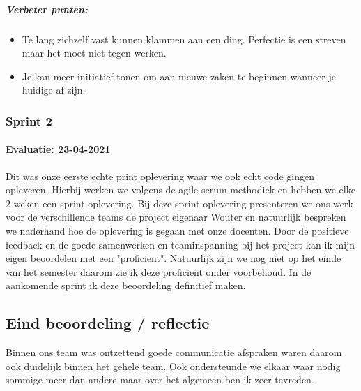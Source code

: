 	\subparagraph{Verbeter punten:}
	\begin{itemize}
		\setlength{\itemsep}{0pt}%
		\setlength{\parskip}{0pt}%
		\item Te lang zichzelf vast kunnen klammen aan een ding.
		Perfectie is een streven maar het moet niet tegen werken.
		\item Je kan meer initiatief tonen om aan nieuwe zaken te beginnen wanneer je huidige af zijn.
	\end{itemize}

	\bigskip

	\subsubsection{Sprint 2}
	\paragraph{Evaluatie: 23-04-2021}
	Dit was onze eerste echte print oplevering waar we ook echt code gingen opleveren.
	Hierbij werken we volgens de agile scrum methodiek en hebben we elke 2 weken een sprint oplevering.
	Bij deze sprint-oplevering presenteren we ons werk voor de verschillende teams de project eigenaar Wouter en
	natuurlijk bespreken we naderhand hoe de oplevering is gegaan met onze docenten.
	Door de positieve feedback en de goede samenwerken en teaminspanning bij het project kan ik mijn eigen
	beoordelen met een "proficient".
	Natuurlijk zijn we nog niet op het einde van het semester daarom zie ik deze proficient onder voorbehoud.
	In de aankomende sprint ik deze beoordeling definitief maken.





\subsection{Eind beoordeling / reflectie}
%
	Binnen ons team was ontzettend goede communicatie afspraken waren daarom ook duidelijk binnen het gehele team.
	Ook ondersteunde we elkaar waar nodig sommige meer dan andere maar over het algemeen ben ik zeer tevreden.

\newpage
